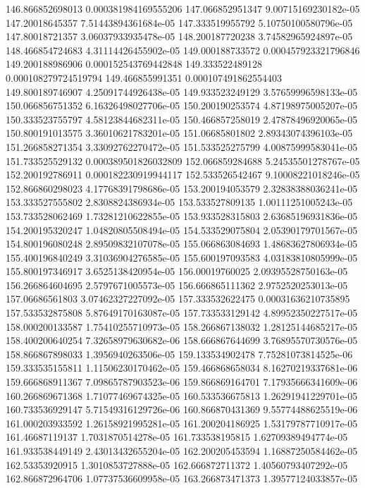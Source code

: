 {146.866852698013 0.000381984169555206
147.066852951347 9.00715169230182e-05
147.20018645357 7.51443894361684e-05
147.333519955792 5.10750100580796e-05
147.80018721357 3.06037933935478e-05
148.200187720238 3.74582965924897e-05
148.466854724683 4.31114426455902e-05
149.000188733572 0.000457923321796846
149.200188986906 0.000152543769442848
149.333522489128 0.000108279724519794
149.466855991351 0.000107491862554403
149.800189746907 4.25091744926438e-05
149.933523249129 3.57659996598133e-05
150.066856751352 6.16326498027706e-05
150.200190253574 4.87198975005207e-05
150.333523755797 4.58123844682311e-05
150.466857258019 2.47878496920065e-05
150.800191013575 3.36010621783201e-05
151.06685801802 2.89343074396103e-05
151.266858271354 3.33092762270472e-05
151.533525275799 4.00875999583041e-05
151.733525529132 0.000389501826032809
152.066859284688 5.24535501278767e-05
152.200192786911 0.000182230919944117
152.533526542467 9.10008221018246e-05
152.866860298023 4.17768391798686e-05
153.200194053579 2.32838388036241e-05
153.333527555802 2.8308824386934e-05
153.533527809135 1.00111251005243e-05
153.733528062469 1.73281210622855e-05
153.933528315803 2.63685196931836e-05
154.200195320247 1.04820805508494e-05
154.533529075804 2.05390179701567e-05
154.800196080248 2.89509832107078e-05
155.066863084693 1.48683627806934e-05
155.400196840249 3.31036904276585e-05
155.600197093583 4.03183810805999e-05
155.800197346917 3.6525138420954e-05
156.00019760025 2.09395528750163e-05
156.266864604695 2.5797671005573e-05
156.666865111362 2.9752520253013e-05
157.06686561803 3.07462327227092e-05
157.333532622475 0.00031636210735895
157.533532875808 5.87649170163087e-05
157.733533129142 4.89952350227517e-05
158.000200133587 1.75410255710973e-05
158.266867138032 1.28125144685217e-05
158.400200640254 7.32658979630682e-06
158.666867644699 3.76895570730576e-05
158.866867898033 1.3956940263506e-05
159.133534902478 7.75281073814525e-06
159.333535155811 1.11506230170462e-05
159.466868658034 8.16270219337681e-06
159.666868911367 7.09865787903523e-06
159.866869164701 7.17935666341609e-06
160.266869671368 1.71077469674325e-05
160.533536675813 1.26291941229701e-05
160.733536929147 5.71549316129726e-06
160.866870431369 9.55774488625519e-06
161.000203933592 1.26158921995281e-05
161.200204186925 1.53179787710917e-05
161.46687119137 1.7031870514278e-05
161.733538195815 1.62709389494774e-05
161.933538449149 2.43013432655204e-05
162.200205453594 1.16887250584462e-05
162.53353920915 1.3010853727888e-05
162.666872711372 1.40560793407292e-05
162.866872964706 1.07737536609958e-05
163.266873471373 1.39577124033857e-05
}

